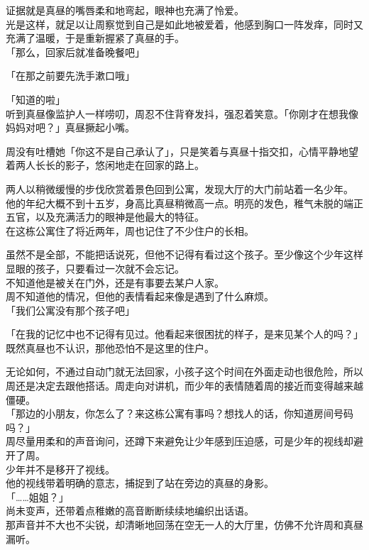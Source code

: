 证据就是真昼的嘴唇柔和地弯起，眼神也充满了怜爱。\\

光是这样，就足以让周察觉到自己是如此地被爱着，他感到胸口一阵发痒，同时又充满了温暖，于是重新握紧了真昼的手。\\

「那么，回家后就准备晚餐吧」

「在那之前要先洗手漱口哦」

「知道的啦」\\

听到真昼像监护人一样唠叨，周忍不住背脊发抖，强忍着笑意。「你刚才在想我像妈妈对吧？」真昼撅起小嘴。

周没有吐槽她「你这不是自己承认了」，只是笑着与真昼十指交扣，心情平静地望着两人长长的影子，悠闲地走在回家的路上。\\

\vspace{2\baselineskip}

两人以稍微缓慢的步伐欣赏着景色回到公寓，发现大厅的大门前站着一名少年。\\

他的年纪大概不到十五岁，身高比真昼稍微高一点。明亮的发色，稚气未脱的端正五官，以及充满活力的眼神是他最大的特征。\\

在这栋公寓住了将近两年，周也记住了不少住户的长相。

虽然不是全部，不能把话说死，但他不记得有看过这个孩子。至少像这个少年这样显眼的孩子，只要看过一次就不会忘记。\\

不知道他是被关在门外，还是有事要去某户人家。\\

周不知道他的情况，但他的表情看起来像是遇到了什么麻烦。\\

「我们公寓没有那个孩子吧」

「在我的记忆中也不记得有见过。他看起来很困扰的样子，是来见某个人的吗？」\\

既然真昼也不认识，那他恐怕不是这里的住户。

无论如何，不通过自动门就无法回家，小孩子这个时间在外面走动也很危险，所以周还是决定去跟他搭话。周走向对讲机，而少年的表情随着周的接近而变得越来越僵硬。\\

「那边的小朋友，你怎么了？来这栋公寓有事吗？想找人的话，你知道房间号码吗？」\\

周尽量用柔和的声音询问，还蹲下来避免让少年感到压迫感，可是少年的视线却避开了周。\\

少年并不是移开了视线。\\

他的视线带着明确的意志，捕捉到了站在旁边的真昼的身影。\\

「……姐姐？」\\

尚未变声，还带着点稚嫩的高音断断续续地编织出话语。\\

那声音并不大也不尖锐，却清晰地回荡在空无一人的大厅里，仿佛不允许周和真昼漏听。
